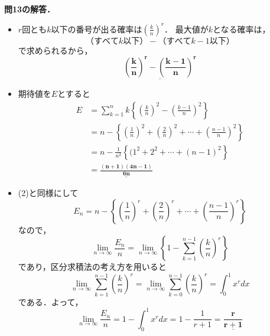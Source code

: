 \documentclass[a4paper,11pt]{ltjsarticle}
\begin{document}
　

\noindent\textbf{問13の解答．}\\[5pt]
\begin{itemize}
    \item [(1)]$\displaystyle{r}$回とも$\displaystyle{k}$以下の番号が出る確率は$\displaystyle{\left(\frac{k}{n}\right)^r}$．
    最大値が$\displaystyle{k}$となる確率は，\[（すべて{k}以下）-（すべてk-1以下）\]で求められるから，
    \[\underline{\boldsymbol{\left(\frac{k}{n}\right)^r-\left(\frac{k-1}{n}\right)^r}}\]
    \item [(2)]期待値を$E$とすると
    \begin{align*}
    E &= \sum_{k=1}^n k \left\{ \left(\frac{k}{n}\right)^2-\left(\frac{k-1}{n}\right)^2 \right\}\\&= n-\left\{\left(\frac{1}{n}\right)^2+\left(\frac{2}{n}\right)^2+\cdots+\left(\frac{n-1}{n}\right)^2\right\} \\
    &= n-\frac1{n^2}\left\{(1^2+2^2+\cdots+(n-1)^2\right\} \\
    &= \underline{\boldsymbol{\frac{(n+1)(4n-1)}{6n}}}
    \end{align*}
    \item [(3)](2)と同様にして
   \[E_n=n-\left\{\left(\frac{1}{n}\right)^r+\left(\frac{2}{n}\right)^r+\cdots+\left(\frac{n-1}{n}\right)^r\right\}\]
   なので，
   \[\lim_{n\to\infty}\frac{E_n}{n}=\lim_{n\to\infty}\left\{1-\sum_{k=1}^{n-1}\left(\frac kn\right)^r\right\}\]
   であり，区分求積法の考え方を用いると
   \[\lim_{n\to\infty}\sum_{k=1}^{n-1}\left(\frac kn\right)^r=\lim_{n\to\infty}\sum_{k=0}^{n-1}\left(\frac kn\right)^r=\int_0^1 x^r dx\]
   である．よって，
    \[\lim_{n\to\infty}\frac{E_n}{n}=1 - \int_0^1 x^r dx = 1 - \frac{1}{r+1} = \underline{\boldsymbol{\frac{r}{r+1}}}\]
\end{itemize}
　
\end{document}
